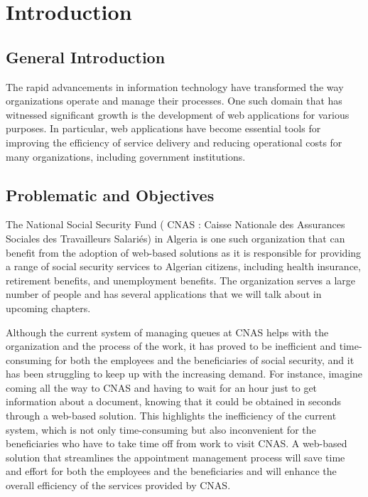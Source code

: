 \chapter{Introduction}
\section{General Introduction}

The rapid advancements in information technology have transformed the way organizations operate and manage their processes. One such domain that has witnessed significant growth is the development of web applications for various purposes. In particular, web applications have become essential tools for improving the efficiency of service delivery and reducing operational costs for many organizations, including government institutions.

\section{Problematic and Objectives}
The National Social Security Fund ( CNAS : Caisse Nationale des Assurances Sociales des Travailleurs Salariés) in Algeria is one such organization that can benefit from the adoption of web-based solutions as it is responsible for providing a range of social security services to Algerian citizens, including health insurance, retirement benefits, and unemployment benefits. The organization serves a large number of people and has several applications that we will talk about in upcoming chapters. 

Although the current system of managing queues at CNAS helps with the organization and the process of the work, it has proved to be inefficient and time-consuming for both the employees and the beneficiaries of social security, and it has been struggling to keep up with the increasing demand. For instance, imagine coming all the way to CNAS and having to wait for an hour just to get information about a document, knowing that it could be obtained in seconds through a web-based solution. This highlights the inefficiency of the current system, which is not only time-consuming but also inconvenient for the beneficiaries who have to take time off from work to visit CNAS. A web-based solution that streamlines the appointment management process will save time and effort for both the employees and the beneficiaries and will enhance the overall efficiency of the services provided by CNAS.

